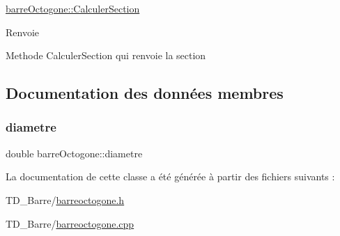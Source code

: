 \hyperlink{classbarre_octogone_a11253e9fe3c969943a950d97ddd36f66}{barre\+Octogone\+::\+Calculer\+Section} 

\begin{DoxyReturn}{Renvoie}

\end{DoxyReturn}
Methode Calculer\+Section qui renvoie la section 

\subsection{Documentation des données membres}
\mbox{\label{classbarre_octogone_ae1673cb5bb0f18d179ddb04c17e9e59e}} 
\subsubsection{\texorpdfstring{diametre}{diametre}}
{\footnotesize\ttfamily double barre\+Octogone\+::diametre\hspace{0.3cm}{\ttfamily [protected]}}



La documentation de cette classe a été générée à partir des fichiers suivants \+:\begin{DoxyCompactItemize}
\item 
T\+D\+\_\+\+Barre/\hyperlink{barreoctogone_8h}{barreoctogone.\+h}\item 
T\+D\+\_\+\+Barre/\hyperlink{barreoctogone_8cpp}{barreoctogone.\+cpp}\end{DoxyCompactItemize}
